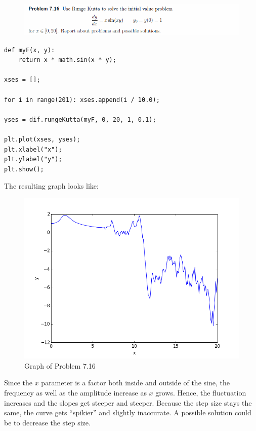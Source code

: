 \begin{figure}[!ht]
\includegraphics[width=1\textwidth]{chapters/images/desc-7-16}
\end{figure}

\begin{lstlisting}[caption=Problem 7.16]
def myF(x, y):
	return x * math.sin(x * y);

xses = [];

for i in range(201): xses.append(i / 10.0);

yses = dif.rungeKutta(myF, 0, 20, 1, 0.1);

plt.plot(xses, yses);
plt.xlabel("x");
plt.ylabel("y");
plt.show();
\end{lstlisting}

The resulting graph looks like:

\begin{figure}[!ht]
\includegraphics[width=1\textwidth]{chapters/images/figure-7-16}
\caption{Graph of Problem 7.16}
\end{figure}


Since the $x$ parameter is a factor both inside and outside of the sine, the frequency as well as the amplitude increase as $x$ grows. Hence, the fluctuation increases and the slopes get steeper and steeper. Because the step size stays the same, the curve gets \enquote{spikier} and slightly inaccurate. A possible solution could be to decrease the step size.

